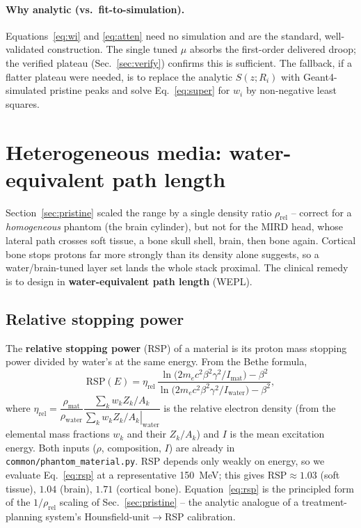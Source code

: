 \documentclass[11pt]{article}
\begin{document}
\paragraph{Why analytic (vs.\ fit-to-simulation).} Equations~\eqref{eq:wi} and
\eqref{eq:atten} need no simulation and are the standard, well-validated
construction. The single tuned $\mu$ absorbs the first-order delivered droop; the
verified plateau (Sec.~\ref{sec:verify}) confirms this is sufficient. The
fallback, if a flatter plateau were needed, is to replace the analytic $S(z;R_i)$
with Geant4-simulated pristine peaks and solve Eq.~\eqref{eq:super} for $w_i$ by
non-negative least squares.

\section{Heterogeneous media: water-equivalent path length}
\label{sec:wepl}

Section~\ref{sec:pristine} scaled the range by a single density ratio
$\rho_{\mathrm{rel}}$ -- correct for a \emph{homogeneous} phantom (the brain
cylinder), but not for the MIRD head, whose lateral path crosses soft tissue, a
bone skull shell, brain, then bone again. Cortical bone stops protons far more
strongly than its density alone suggests, so a water/brain-tuned layer set lands
the whole stack proximal. The clinical remedy is to design in
\textbf{water-equivalent path length} (WEPL).

\subsection{Relative stopping power}
The \textbf{relative stopping power} (RSP) of a material is its proton mass
stopping power divided by water's at the same energy. From the Bethe formula,
\begin{equation}
\mathrm{RSP}(E)=\eta_{\mathrm{rel}}\,
\frac{\ln\!\big(2 m_e c^2\beta^2\gamma^2/I_{\mathrm{mat}}\big)-\beta^2}
{\ln\!\big(2 m_e c^2\beta^2\gamma^2/I_{\mathrm{water}}\big)-\beta^2},
\label{eq:rsp}
\end{equation}
where
$\eta_{\mathrm{rel}}=\dfrac{\rho_{\mathrm{mat}}}{\rho_{\mathrm{water}}}
\dfrac{\sum_k w_k Z_k/A_k}{\left.\sum_k w_k Z_k/A_k\right|_{\mathrm{water}}}$
is the relative electron density (from the elemental mass fractions $w_k$ and
their $Z_k/A_k$) and $I$ is the mean excitation energy. Both inputs ($\rho$,
composition, $I$) are already in \texttt{common/phantom\_material.py}. RSP depends
only weakly on energy, so we evaluate Eq.~\eqref{eq:rsp} at a representative
\SI{150}{MeV}; this gives $\mathrm{RSP}\approx1.03$ (soft tissue), $1.04$ (brain),
$1.71$ (cortical bone). Equation~\eqref{eq:rsp} is the principled form of the
$1/\rho_{\mathrm{rel}}$ scaling of Sec.~\ref{sec:pristine} -- the analytic analogue
of a treatment-planning system's Hounsfield-unit$\to$RSP calibration.
\end{document}
